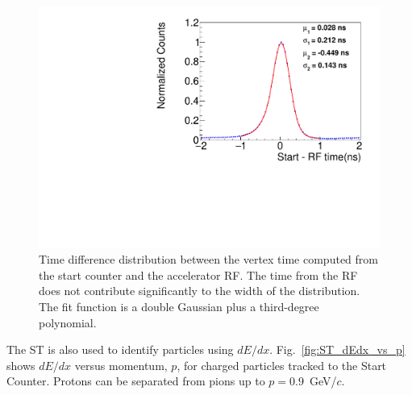 
\begin{figure}[tbh]
  \centering
  \includegraphics[width=0.6\linewidth]{figures/st_tr_fit.pdf}  
  \caption{Time difference distribution between the vertex time computed from the start counter and the accelerator RF. The time from the RF does not contribute significantly to the width of the distribution. The fit function is a double Gaussian plus a third-degree polynomial.
  }
                \label{fig:st-time-resolution}
\end{figure}  


The ST is also used to identify particles using $dE/dx$. Fig.~\ref{fig:ST_dEdx_vs_p} shows $dE/dx$ versus momentum, $p$,
for charged particles tracked to the Start Counter. Protons can be
separated from pions up to $p=0.9$~GeV/$c$.

